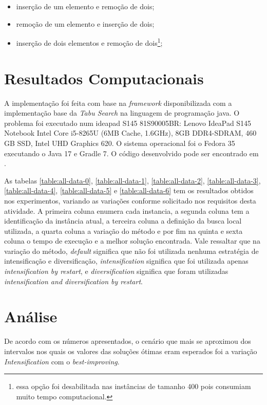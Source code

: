\documentclass[brazilian,12pt]{article}
\begin{document}
\begin{itemize}
    \item inserção de um elemento e remoção de dois;
    \item remoção de um elemento e inserção de dois;
    \item inserção de dois elementos e remoção de dois\footnote{essa opção foi desabilitada nas instâncias de tamanho 400 pois consumiam muito tempo computacional.};
\end{itemize}

\section{Resultados Computacionais}

    A implementação foi feita com base na \textit{framework} disponibilizada com a implementação base da \textit{Tabu Search} na linguagem de programação java. O problema foi executado num ideapad S145 81S90005BR: Lenovo IdeaPad S145 Notebook Intel Core i5-8265U (6MB Cache, 1.6GHz), 8GB DDR4-SDRAM, 460 GB SSD, Intel UHD Graphics 620. O sistema operacional foi o Fedora 35 executando o Java 17 e Gradle 7. O código desenvolvido pode ser encontrado em \cite{Github}.
    
    As tabelas \ref{table:all-data-0}, \ref{table:all-data-1}, \ref{table:all-data-2}, \ref{table:all-data-3}, \ref{table:all-data-4}, \ref{table:all-data-5} e \ref{table:all-data-6} tem os resultados obtidos nos experimentos, variando as variações conforme solicitado nos requisitos desta atividade. A primeira coluna enumera cada instancia, a segunda coluna tem a identificação da instância atual, a terceira coluna a definição da busca local utilizada, a quarta coluna a variação do método e por fim na quinta e sexta coluna o tempo de execução e a melhor solução encontrada. Vale ressaltar que na variação do método, \textit{default} significa que não foi utilizada nenhuma estratégia de intensificação e diversificação, \textit{intensification} significa que foi utilizada apenas \textit{intensification by restart}, e \textit{diversification} significa que foram utilizadas \textit{intensification and diversification by restart}.



\section{Análise}
De acordo com os números apresentados, o cenário que mais se aproximou dos intervalos nos
quais os valores das soluções ótimas eram esperados foi a variação \textit{Intensification} com o \textit{best-improving}.
\end{document}
